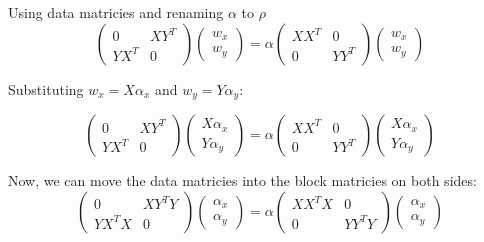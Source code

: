 Using data matricies and renaming $\alpha$ to $\rho$
\begin{equation}
    \begin{pmatrix}
        0 & X Y^T \\
        Y X^T & 0
    \end{pmatrix}
    \begin{pmatrix}
        w_x \\ w_y
    \end{pmatrix}
    = \alpha \begin{pmatrix}
        X X^T & 0 \\
        0 & Y Y^T
    \end{pmatrix}
    \begin{pmatrix}
        w_x \\ w_y
    \end{pmatrix}
\end{equation}

Substituting $w_x = X \alpha_x $ and $w_y = Y \alpha_y $:

\begin{equation}
    \begin{pmatrix}
        0 & X Y^T \\
        Y X^T & 0
    \end{pmatrix}
    \begin{pmatrix}
        X \alpha_x \\ Y \alpha_y
    \end{pmatrix}
    = \alpha \begin{pmatrix}
        X X^T & 0 \\
        0 & Y Y^T
    \end{pmatrix}
    \begin{pmatrix}
        X \alpha_x \\ Y \alpha_y
    \end{pmatrix}
\end{equation}

Now, we can move the data matricies into the block matricies on both sides:
\begin{equation}
    \begin{pmatrix}
        0 & X Y^T Y \\
        Y X^T X & 0
    \end{pmatrix}
    \begin{pmatrix}
        \alpha_x \\ \alpha_y
    \end{pmatrix}
    = \alpha \begin{pmatrix}
        X X^T X & 0 \\
        0 & Y Y^T Y
    \end{pmatrix}
    \begin{pmatrix}
        \alpha_x \\ \alpha_y
    \end{pmatrix}
\end{equation}

